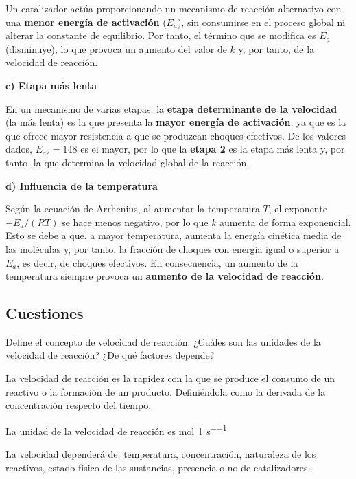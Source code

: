 \begin{exercise}
\begin{solu}
        Un catalizador actúa proporcionando un mecanismo de reacción alternativo con una \textbf{menor energía de activación} (\(E_a\)), sin consumirse en el proceso global ni alterar la constante de equilibrio. Por tanto, el término que se modifica es \(E_a\) (disminuye), lo que provoca un aumento del valor de \(k\) y, por tanto, de la velocidad de reacción.

        \textbf{c) Etapa más lenta}

        En un mecanismo de varias etapas, la \textbf{etapa determinante de la velocidad} (la más lenta) es la que presenta la \textbf{mayor energía de activación}, ya que es la que ofrece mayor resistencia a que se produzcan choques efectivos. De los valores dados, \(E_{a2} = 148\) es el mayor, por lo que la \textbf{etapa 2} es la etapa más lenta y, por tanto, la que determina la velocidad global de la reacción.

        \textbf{d) Influencia de la temperatura}

        Según la ecuación de Arrhenius, al aumentar la temperatura \(T\), el exponente \(-E_a/(RT)\) se hace menos negativo, por lo que \(k\) aumenta de forma exponencial. Esto se debe a que, a mayor temperatura, aumenta la energía cinética media de las moléculas y, por tanto, la fracción de choques con energía igual o superior a \(E_a\), es decir, de choques efectivos. En consecuencia, un aumento de la temperatura siempre provoca un \textbf{aumento de la velocidad de reacción}.

    \end{solu}
\end{exercise}

\subsection{Cuestiones}

\begin{question}
    Define el concepto de velocidad de reacción.
    ¿Cuáles son las unidades de la velocidad de reacción? ¿De qué factores depende?

    \begin{solu}
        La velocidad de reacción es la rapidez con la que se produce el consumo de un reactivo o la formación de un producto.
        Definiéndola como la derivada de la concentración respecto del tiempo.

        La unidad de la velocidad de reacción es \si{\mole\per\litre\per\s}

        La velocidad dependerá de: temperatura, concentración, naturaleza de los reactivos, estado físico de las sustancias, presencia o no de catalizadores.
    \end{solu}
\end{question}

